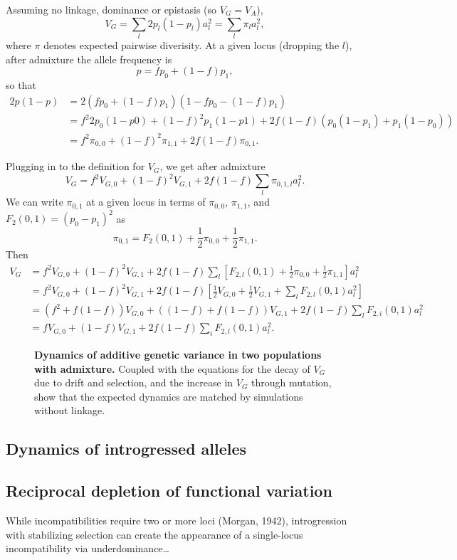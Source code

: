 \documentclass{article}
\begin{document}
Assuming no linkage, dominance or epistasis (so \(V_G=V_A\)),
\[V_G = \sum_l 2p_l(1-p_l)a_l^2 = \sum_l \pi_l a_l^2,\]
where $\pi$ denotes expected pairwise diverisity.
At a given locus (dropping the $l$), after admixture the allele frequency is
\[p=f p_0 + (1-f) p_1,\]
so that
\begin{align*}
    2p(1-p) & = 2(f p_0 + (1-f) p_1)(1 - f p_0 - (1-f) p_1) \\
    & = f^2 2p_0(1-p0) + (1-f)^2 p_1(1-p1) + 2f(1-f) (p_0(1-p_1) + p_1(1-p_0)) \\
    & = f^2 \pi_{0,0} + (1-f)^2 \pi_{1,1} + 2f(1-f)\pi_{0,1}.
\end{align*}

Plugging in to the definition for $V_G$, we get after admixture
\[V_G = f^2 V_{G,0} + (1-f)^2 V_{G,1} + 2f(1-f)\sum_l \pi_{0,1,l}a_l^2.\]
We can write $\pi_{0,1}$ at a given locus in terms of $\pi_{0,0}$, $\pi_{1,1}$,
and $F_2(0,1)=(p_0-p_1)^2$ as \citep{peter2016admixture}
\[\pi_{0,1} = F_2(0,1) + \frac{1}{2}\pi_{0,0} + \frac{1}{2}\pi_{1,1}.\]
Then
\begin{align*}
    V_G & = f^2 V_{G,0} + (1-f)^2 V_{G,1} + 2f(1-f)\sum_l \left[F_{2,l}(0,1)
    + \frac{1}{2}\pi_{0,0} + \frac{1}{2}\pi_{1,1}\right] a_l^2 \\
    & = f^2 V_{G,0} + (1-f)^2 V_{G,1} + 2f(1-f)\left[\frac{1}{2}V_{G,0} 
    + \frac{1}{2}V_{G,1} + \sum_l F_{2,l}(0,1)a_l^2\right] \\
    & = \left(f^2 + f(1-f)\right) V_{G,0} + \left((1-f) + f(1-f)\right)V_{G,1}
    + 2f(1-f) \sum_l F_{2,i}(0,1)a_l^2 \\
    & = f V_{G,0} + (1-f)V_{G,1} + 2f(1-f)\sum_i F_{2,l}(0,1)a_l^2.
\end{align*}


\begin{figure}[tb!]
    \centering
    \caption{
        \textbf{Dynamics of additive genetic variance in two populations with admixture.}
        Coupled with the equations for the decay of $V_G$ due to drift and selection,
        and the increase in $V_G$ through mutation, show that the expected dynamics
        are matched by simulations without linkage.
    }
    \label{fig:VG_dynamics}
\end{figure}

\subsection{Dynamics of introgressed alleles}

\subsection{Reciprocal depletion of functional variation}

While incompatibilities require two or more loci (Morgan, 1942), introgression
with stabilizing selection can create the appearance of a single-locus
incompatibility via underdominance\dots
\end{document}
